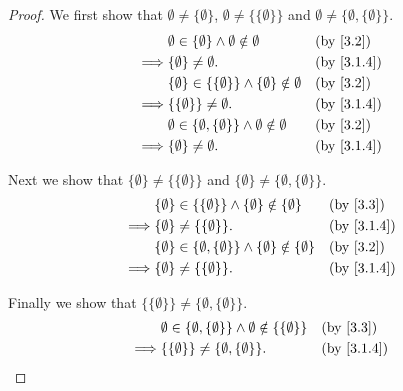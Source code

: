 \begin{proof}
  We first show that \(\emptyset \neq \{\emptyset\}\), \(\emptyset \neq \{\{\emptyset\}\}\) and \(\emptyset \neq \{\emptyset, \{\emptyset\}\}\).
  \begin{align*}
             & \emptyset \in \{\emptyset\} \land \emptyset \notin \emptyset                &  & \text{(by \cref{3.2})}   \\
    \implies & \{\emptyset\} \neq \emptyset.                                               &  & \text{(by \cref{3.1.4})} \\
             & \{\emptyset\} \in \{\{\emptyset\}\} \land \{\emptyset\} \notin \emptyset    &  & \text{(by \cref{3.2})}   \\
    \implies & \{\{\emptyset\}\} \neq \emptyset.                                           &  & \text{(by \cref{3.1.4})} \\
             & \emptyset \in \{\emptyset, \{\emptyset\}\} \land \emptyset \notin \emptyset &  & \text{(by \cref{3.2})}   \\
    \implies & \{\emptyset\} \neq \emptyset.                                               &  & \text{(by \cref{3.1.4})}
  \end{align*}

  Next we show that \(\{\emptyset\} \neq \{\{\emptyset\}\}\) and \(\{\emptyset\} \neq \{\emptyset, \{\emptyset\}\}\).
  \begin{align*}
             & \{\emptyset\} \in \{\{\emptyset\}\} \land \{\emptyset\} \notin \{\emptyset\}            &  & \text{(by \cref{3.3})}   \\
    \implies & \{\emptyset\} \neq \{\{\emptyset\}\}.                                                   &  & \text{(by \cref{3.1.4})} \\
             & \{\emptyset\} \in \{\emptyset, \{\emptyset\}\} \land \{\emptyset\} \notin \{\emptyset\} &  & \text{(by \cref{3.2})}   \\
    \implies & \{\emptyset\} \neq \{\{\emptyset\}\}.                                                   &  & \text{(by \cref{3.1.4})}
  \end{align*}

  Finally we show that \(\{\{\emptyset\}\} \neq \{\emptyset, \{\emptyset\}\}\).
  \begin{align*}
             & \emptyset \in \{\emptyset, \{\emptyset\}\} \land \emptyset \notin \{\{\emptyset\}\} &  & \text{(by \cref{3.3})}   \\
    \implies & \{\{\emptyset\}\} \neq \{\emptyset, \{\emptyset\}\}.                                &  & \text{(by \cref{3.1.4})}
  \end{align*}
\end{proof}


